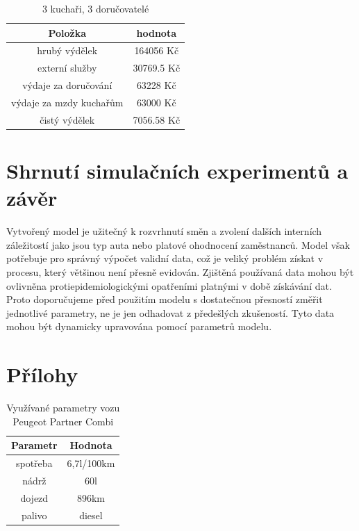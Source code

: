 \documentclass[a4paper, 11pt]{article}
\begin{document}
\begin{table}[h]
\centering
\begin{tabular}{cc}
\textbf{Položka} & \textbf{hodnota}                                                                                   \\ \hline
hrubý výdělek & 164056 Kč \\ \hline
externí služby  & 30769.5 Kč \\ \hline
výdaje za doručování &  63228 Kč \\ \hline
výdaje za mzdy kuchařům &  63000 Kč \\ \hline
čistý výdělek &  7056.58 Kč \\ \hline
\end{tabular}
\caption{3 kuchaři, 3 doručovatelé}
\end{table}


\newpage
\section{Shrnutí simulačních experimentů a závěr}
Vytvořený model je užitečný k rozvrhnutí směn a zvolení dalších interních záležitostí jako jsou typ auta nebo platové ohodnocení zaměstnanců. Model však potřebuje pro správný výpočet validní data, což je veliký problém získat v procesu, který většinou není přesně evidován. Zjištěná používaná data mohou být ovlivněna protiepidemiologickými opatřeními platnými v době získávání dat. Proto doporučujeme před použitím modelu s dostatečnou přesností změřit jednotlivé parametry, ne je jen odhadovat z předešlých zkušeností. Tyto data mohou být dynamicky upravována pomocí parametrů modelu.


\newpage
\section*{Přílohy}
\begin{table}[h]
\centering
\begin{tabular}{cc}
\textbf{Parametr} & \textbf{Hodnota}                                                                                   \\ \hline
spotřeba & 6,7l/100km \\ \hline
nádrž  & 60l \\ \hline                      
dojezd &  896km \\ \hline
palivo & diesel
\end{tabular}
\caption{Využívané parametry vozu Peugeot Partner Combi}
\label{tab:1}
\end{table}
\end{document}
